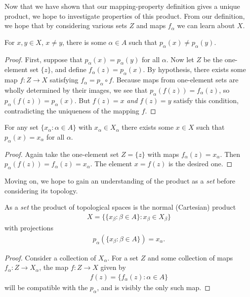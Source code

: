         Now that we have shown that our mapping-property definition gives a unique product, we hope to investigate properties of this product.
        From our definition, we hope that by considering various sets $Z$ and maps $f_\alpha$ we can learn about $X$.
        \begin{claim}
          For $x,y\in X$, $x\ne y$, there is some $\alpha\in A$ such that $p_\alpha(x)\ne p_\alpha(y)$.
          \begin{proof}
            First, suppose that $p_\alpha(x)=p_\alpha(y)$ for all $\alpha$.
            Now let $Z$ be the one-element set $\{z\}$, and define $f_\alpha(z)=p_\alpha(x)$.
            By hypothesis, there exists some map $f:Z\rightarrow X$ satisfying $f_\alpha = p_\alpha \circ f$.
            Because maps from one-element sets are wholly determined by their images, we see that $p_\alpha(f(z))=f_\alpha(z)$, so $p_\alpha(f(z))=p_\alpha(x)$.
            But $f(z)=x$ \emph{and} $f(z)=y$ satisfy this condition, contradicting the uniqueness of the mapping $f$.
          \end{proof}
        \end{claim}

        \begin{claim}
          For any set $\{x_\alpha:\alpha\in A\}$ with $x_\alpha\in X_\alpha$ there exists some $x\in X$ such that $p_\alpha(x)=x_\alpha$ for all $\alpha$.
          \begin{proof}
            Again take the one-element set $Z=\{z\}$ with maps $f_\alpha(z)=x_\alpha$.
            Then $p_\alpha(f(z))=f_\alpha(z)=x_\alpha$.
            The element $x=f(z)$ is the desired one.
          \end{proof}
        \end{claim}
        
        Moving on, we hope to gain an understanding of the product as a \emph{set} before considering its topology.
        \begin{claim}
          As a \emph{set} the product of topological spaces is the normal (Cartesian) product
          \begin{align*}
            X = \{\{x_\beta:\beta\in A\}: x_\beta\in X_\beta\}
          \end{align*}
          with projections
          \begin{align*}
            p_\alpha(\{x_\beta:\beta\in A\}) = x_\alpha\text{.}
          \end{align*}
          \begin{proof}
            Consider a collection of $X_\alpha$.
            For a set $Z$ and some collection of maps $f_\alpha:Z\rightarrow X_\alpha$, the map $f:Z\rightarrow X$ given by
            \begin{align*}
              f(z) = \{f_\alpha(z):\alpha\in A\}
            \end{align*}
            will be compatible with the $p_\alpha$, and is visibly the only such map.
          \end{proof}
        \end{claim}

